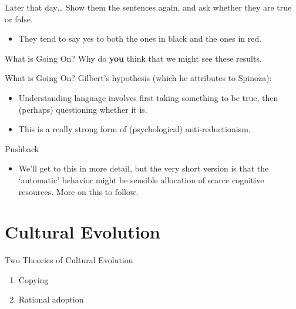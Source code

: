 \documentclass[
  17pt,
  letterpaper,
  ignorenonframetext,
  aspectratio=169,
]{beamer}
\providecommand{\tightlist}{%
  \setlength{\itemsep}{0pt}\setlength{\parskip}{0pt}}\usepackage{longtable,booktabs,array}
\begin{document}
\begin{frame}{Later that day\ldots{}}
\protect\hypertarget{later-that-day}{}
Show them the sentences again, and ask whether they are true or false.

\begin{itemize}[<+->]
\tightlist
\item
  They tend to say yes to both the ones in black and the ones in red.
\end{itemize}
\end{frame}

\begin{frame}{What is Going On?}
\protect\hypertarget{what-is-going-on}{}
Why do \textbf{you} think that we might see these results.
\end{frame}

\begin{frame}{What is Going On?}
\protect\hypertarget{what-is-going-on-1}{}
Gilbert's hypothesis (which he attributes to Spinoza):

\begin{itemize}[<+->]
\tightlist
\item
  Understanding language involves first taking something to be true,
  then (perhaps) questioning whether it is.
\item
  This is a really strong form of (psychological) anti-reductionism.
\end{itemize}
\end{frame}

\begin{frame}{Pushback}
\protect\hypertarget{pushback}{}
\begin{itemize}[<+->]
\tightlist
\item
  We'll get to this in more detail, but the very short version is that
  the `automatic' behavior might be sensible allocation of scarce
  cognitive resources. More on this to follow.
\end{itemize}
\end{frame}

\hypertarget{cultural-evolution}{%
\section{Cultural Evolution}\label{cultural-evolution}}

\begin{frame}{Two Theories of Cultural Evolution}
\protect\hypertarget{two-theories-of-cultural-evolution}{}
\begin{enumerate}[<+->]
\tightlist
\item
  Copying
\item
  Rational adoption
\end{enumerate}
\end{frame}
\end{document}
